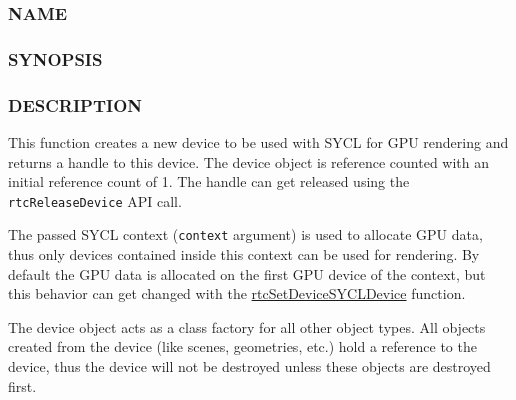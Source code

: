 \subsubsection{NAME}\label{name}

\begin{Shaded}
\begin{Highlighting}[]
\OperatorTok{{-}}
\end{Highlighting}
\end{Shaded}

\subsubsection{SYNOPSIS}\label{synopsis}

\begin{Shaded}
\begin{Highlighting}[]

\OperatorTok{(}\OperatorTok{::}\OperatorTok{,}  \OperatorTok{*}\OperatorTok{);}
\end{Highlighting}
\end{Shaded}

\subsubsection{DESCRIPTION}\label{description}

This function creates a new device to be used with SYCL for GPU
rendering and returns a handle to this device. The device object is
reference counted with an initial reference count of 1. The handle can
get released using the \texttt{rtcReleaseDevice} API call.

The passed SYCL context (\texttt{context} argument) is used to allocate
GPU data, thus only devices contained inside this context can be used
for rendering. By default the GPU data is allocated on the first GPU
device of the context, but this behavior can get changed with the
\hyperref[rtcsetdevicesycldevice]{rtcSetDeviceSYCLDevice} function.

The device object acts as a class factory for all other object types.
All objects created from the device (like scenes, geometries, etc.) hold
a reference to the device, thus the device will not be destroyed unless
these objects are destroyed first.

